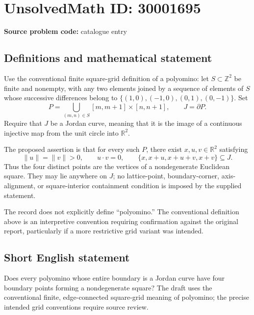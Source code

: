 \documentclass[11pt]{article}
\newcommand{\Z}{\mathbb{Z}}
\newcommand{\R}{\mathbb{R}}
\begin{document}
\section*{UnsolvedMath ID: 30001695}
\textbf{Source problem code:} catalogue entry
\subsection{Definitions and mathematical statement}
Use the conventional finite square-grid definition of a polyomino: let \(S\subset\Z^2\) be finite and nonempty, with any two elements joined by a sequence of elements of \(S\) whose successive differences belong to \(\{(1,0),(-1,0),(0,1),(0,-1)\}\). Set
\[
P=\bigcup_{(m,n)\in S}[m,m+1]\times[n,n+1],\qquad J=\partial P.
\]
Require that \(J\) be a Jordan curve, meaning that it is the image of a continuous injective map from the unit circle into \(\R^2\).

The proposed assertion is that for every such \(P\), there exist \(x,u,v\in\R^2\) satisfying
\[
\|u\|=\|v\|>0,\qquad u\cdot v=0,\qquad
\{x,x+u,x+u+v,x+v\}\subseteq J.
\]
Thus the four distinct points are the vertices of a nondegenerate Euclidean square. They may lie anywhere on \(J\); no lattice-point, boundary-corner, axis-alignment, or square-interior containment condition is imposed by the supplied statement.

The record does not explicitly define ``polyomino.'' The conventional definition above is an interpretive convention requiring confirmation against the original report, particularly if a more restrictive grid variant was intended.
\subsection{Short English statement}
Does every polyomino whose entire boundary is a Jordan curve have four boundary points forming a nondegenerate square? The draft uses the conventional finite, edge-connected square-grid meaning of polyomino; the precise intended grid conventions require source review.
\end{document}
